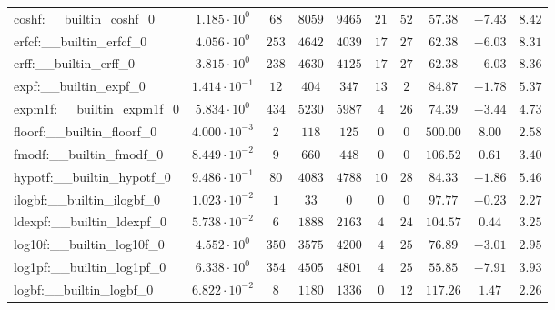 \begin{tabular}{|l|c|c|c|c|c|c|c|c|c|}
coshf:\_\_builtin\_coshf\_0               & $ 1.185 \cdot 10^{0}  $ & $ 68     $ & $ 8059   $ & $ 9465   $ & $ 21  $ & $ 52  $ & $ 57.38       $ & $ -7.43   $ & $ 8.42    $ \\
erfcf:\_\_builtin\_erfcf\_0               & $ 4.056 \cdot 10^{0}  $ & $ 253    $ & $ 4642   $ & $ 4039   $ & $ 17  $ & $ 27  $ & $ 62.38       $ & $ -6.03   $ & $ 8.31    $ \\
erff:\_\_builtin\_erff\_0                 & $ 3.815 \cdot 10^{0}  $ & $ 238    $ & $ 4630   $ & $ 4125   $ & $ 17  $ & $ 27  $ & $ 62.38       $ & $ -6.03   $ & $ 8.36    $ \\
expf:\_\_builtin\_expf\_0                 & $ 1.414 \cdot 10^{-1} $ & $ 12     $ & $ 404    $ & $ 347    $ & $ 13  $ & $ 2   $ & $ 84.87       $ & $ -1.78   $ & $ 5.37    $ \\
expm1f:\_\_builtin\_expm1f\_0             & $ 5.834 \cdot 10^{0}  $ & $ 434    $ & $ 5230   $ & $ 5987   $ & $ 4   $ & $ 26  $ & $ 74.39       $ & $ -3.44   $ & $ 4.73    $ \\
floorf:\_\_builtin\_floorf\_0             & $ 4.000 \cdot 10^{-3} $ & $ 2      $ & $ 118    $ & $ 125    $ & $ 0   $ & $ 0   $ & $ 500.00      $ & $ 8.00    $ & $ 2.58    $ \\
fmodf:\_\_builtin\_fmodf\_0               & $ 8.449 \cdot 10^{-2} $ & $ 9      $ & $ 660    $ & $ 448    $ & $ 0   $ & $ 0   $ & $ 106.52      $ & $ 0.61    $ & $ 3.40    $ \\
hypotf:\_\_builtin\_hypotf\_0             & $ 9.486 \cdot 10^{-1} $ & $ 80     $ & $ 4083   $ & $ 4788   $ & $ 10  $ & $ 28  $ & $ 84.33       $ & $ -1.86   $ & $ 5.46    $ \\
ilogbf:\_\_builtin\_ilogbf\_0             & $ 1.023 \cdot 10^{-2} $ & $ 1      $ & $ 33     $ & $ 0      $ & $ 0   $ & $ 0   $ & $ 97.77       $ & $ -0.23   $ & $ 2.27    $ \\
ldexpf:\_\_builtin\_ldexpf\_0             & $ 5.738 \cdot 10^{-2} $ & $ 6      $ & $ 1888   $ & $ 2163   $ & $ 4   $ & $ 24  $ & $ 104.57      $ & $ 0.44    $ & $ 3.25    $ \\
log10f:\_\_builtin\_log10f\_0             & $ 4.552 \cdot 10^{0}  $ & $ 350    $ & $ 3575   $ & $ 4200   $ & $ 4   $ & $ 25  $ & $ 76.89       $ & $ -3.01   $ & $ 2.95    $ \\
log1pf:\_\_builtin\_log1pf\_0             & $ 6.338 \cdot 10^{0}  $ & $ 354    $ & $ 4505   $ & $ 4801   $ & $ 4   $ & $ 25  $ & $ 55.85       $ & $ -7.91   $ & $ 3.93    $ \\
logbf:\_\_builtin\_logbf\_0               & $ 6.822 \cdot 10^{-2} $ & $ 8      $ & $ 1180   $ & $ 1336   $ & $ 0   $ & $ 12  $ & $ 117.26      $ & $ 1.47    $ & $ 2.26    $ \\

\end{tabular}
